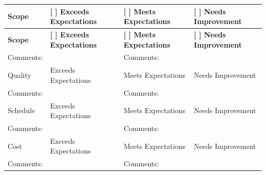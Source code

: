 \documentclass[10pt,letterpaper]{article}
\renewcommand\arraystretch{1.25}
\begin{document}
\begin{center}
\begingroup
\setlength\tabcolsep{2.0pt}
\footnotesize
\renewcommand\arraystretch{1.55}
\begin{longtable}{|>{\raggedright\arraybackslash}p{1.558in}|>{\raggedright\arraybackslash}p{1.558in}|>{\raggedright\arraybackslash}p{1.558in}|>{\raggedright\arraybackslash}p{1.558in}|}
\hline
\rowcolor{light}
\textbf{Scope} & \textbf{[ ] Exceeds Expectations} & \textbf{[ ] Meets Expectations} & \textbf{[ ] Needs Improvement} \\ \hline
\endfirsthead
\hline\rowcolor{light} \textbf{Scope} & \textbf{[ ] Exceeds Expectations} & \textbf{[ ] Meets Expectations} & \textbf{[ ] Needs Improvement} \\ \hline
\endhead
Comments: & \rule{0pt}{11pt}\hspace{0pt} & Comments: & \rule{0pt}{11pt}\hspace{0pt} \\ \hline
Quality & [ ] Exceeds Expectations & [ ] Meets Expectations & [ ] Needs Improvement \\ \hline
Comments: & \rule{0pt}{11pt}\hspace{0pt} & Comments: & \rule{0pt}{11pt}\hspace{0pt} \\ \hline
Schedule & [ ] Exceeds Expectations & [ ] Meets Expectations & [ ] Needs Improvement \\ \hline
Comments: & \rule{0pt}{11pt}\hspace{0pt} & Comments: & \rule{0pt}{11pt}\hspace{0pt} \\ \hline
Cost & [ ] Exceeds Expectations & [ ] Meets Expectations & [ ] Needs Improvement \\ \hline
Comments: & \rule{0pt}{11pt}\hspace{0pt} & Comments: & \rule{0pt}{11pt}\hspace{0pt} \\ \hline
\end{longtable}
\endgroup
\end{center}
\end{document}
